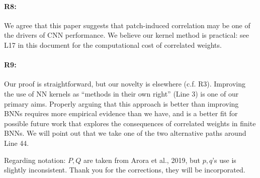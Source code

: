 \documentclass{article}
\begin{document}
\vspace{-1.5ex}
\paragraph{R8:}
We agree that this paper suggests that patch-induced correlation may be one of the drivers of CNN performance. We believe our kernel method is practical: see L17 in this document for the computational cost of correlated weights.

\vspace{-1.5ex}
\paragraph{R9:}
Our proof is straightforward, but our novelty is elsewhere (c.f. R3).
Improving the use of NN kernels as ``methods in their own right'' (Line 3) is one of our primary aims. Properly arguing that this approach is better than improving BNNs requires more empirical evidence than we have, and is a better fit for possible future work that explores the consequences of correlated weights in finite BNNs. We will point out that we take one of the two alternative paths around Line 44.

Regarding notation: $P,Q$ are taken from Arora et al., 2019, but $p,q$'s use is slightly inconsistent. Thank you for the corrections, they will be incorporated.
\end{document}
